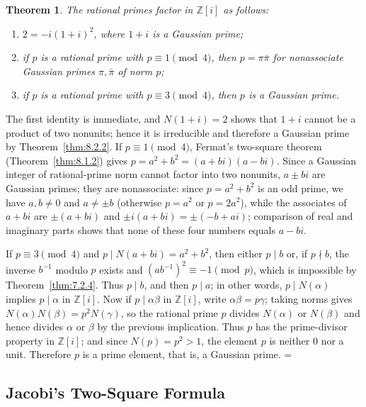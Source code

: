 \documentclass[11pt]{article}
\makeatletter
\theoremstyle{ntstyle}
\newtheorem{theorem}{Theorem}[subsection]
\let\nt@closedisplay\]
\def\nt@guardedclose{\@ifnextchar\par{\nt@closeafterpar}{\@ifnextchar\end{\postdisplaypenalty\@M\nt@closedisplay}{\nt@closedisplay}}}
\def\nt@closeafterpar\par{\@ifnextchar\par{\nt@closeafterpar}{\@ifnextchar\end{\postdisplaypenalty\@M\nt@closedisplay\par}{\nt@closedisplay\par}}}
\renewenvironment{proof}[1][\proofname]{\par
  \pushQED{\qed}\normalfont\topsep\medskipamount\edef\nt@afterproof{\@endparpenalty=\the\@endparpenalty\relax}\@beginparpenalty\@M\@endparpenalty\@M\let\]\nt@guardedclose\trivlist\item[]\textit{#1\@addpunct{.}} \ignorespaces}{\ifvmode\addpenalty\@M\fi\popQED\nt@afterproof\endtrivlist\@endpefalse}
\makeatother
\begin{document}
\begin{theorem}\label{thm:8.2.3}
	The rational primes factor in $\mathbb{Z}[i]$ as follows:
	\begin{enumerate}[label={\alph*)}]
		\item $2=-i(1+i)^2$, where $1+i$ is a Gaussian prime;
		\item if $p$ is a rational prime with $p\equiv1\pmod{4}$, then $p=\pi\bar\pi$ for nonassociate
					Gaussian primes $\pi,\bar\pi$ of norm $p$;
		\item if $p$ is a rational prime with $p\equiv3\pmod{4}$, then $p$ is a Gaussian prime.
	\end{enumerate}
\end{theorem}

\begin{proof} The first identity is immediate, and $N(1+i)=2$ shows that
	$1+i$ cannot be a product of two nonunits; hence it is irreducible and
	therefore a Gaussian prime by Theorem~\ref{thm:8.2.2}. If
	$p\equiv1\pmod{4}$, Fermat's two-square theorem (Theorem~\ref{thm:8.1.2}) gives
	$p=a^2+b^2=(a+bi)(a-bi)$. Since a Gaussian integer of rational-prime
	norm cannot factor into two nonunits, $a\pm bi$ are Gaussian primes;
	they are nonassociate: since $p = a^2+b^2$ is an odd prime, we have
	$a,b\neq0$ and $a\neq\pm b$ (otherwise $p = a^2$ or $p = 2a^2$), while the
	associates of $a+bi$ are $\pm(a+bi)$ and $\pm i(a+bi) = \pm(-b+ai)$;
	comparison of real and imaginary parts shows that none of these four numbers equals
	$a-bi$.

	If $p\equiv3\pmod{4}$ and $p\mid N(a+bi)=a^2+b^2$, then either $p\mid b$
	or, if $p\nmid b$, the inverse $b^{-1}$ modulo $p$ exists and
	$(ab^{-1})^2\equiv-1\pmod{p}$, which is impossible by Theorem~\ref{thm:7.2.4}. Thus
	$p\mid b$, and then $p\mid a$; in other words, $p\mid N(\alpha)$
	implies $p\mid\alpha$ in $\mathbb{Z}[i]$. Now if $p\mid\alpha\beta$ in
	$\mathbb{Z}[i]$, write $\alpha\beta=p\gamma$; taking norms gives
	$N(\alpha)N(\beta)=p^2N(\gamma)$, so the rational prime $p$ divides
	$N(\alpha)$ or $N(\beta)$ and hence divides $\alpha$ or $\beta$ by the
	previous implication. Thus $p$ has the prime-divisor property in
	$\mathbb{Z}[i]$; and since $N(p)=p^2>1$, the element $p$ is neither $0$ nor a unit.
	Therefore $p$ is a prime element, that is, a Gaussian prime.
\end{proof}
\subsection{Jacobi's Two-Square Formula}
\end{document}
